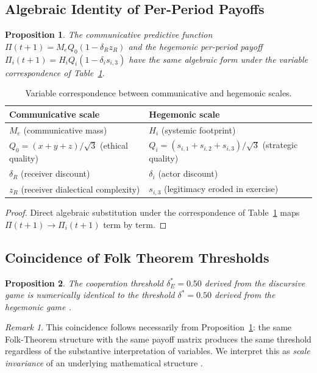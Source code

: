 \documentclass[12pt]{article}
\theoremstyle{plain}
\newtheorem{proposition}{Proposition}
\theoremstyle{definition}
\theoremstyle{remark}
\newtheorem{remark}{Remark}
\begin{document}
\subsection{Algebraic Identity of Per-Period Payoffs}

\begin{proposition}\label{prop:scale}
The communicative predictive function $\Pi(t+1) = M_e Q_0 (1 - \delta_R z_R)$ and the hegemonic per-period payoff $\Pi_i(t+1) = H_i Q_i (1 - \delta_i s_{i,3})$ have the same algebraic form under the variable correspondence of Table~\ref{tab:scale}.
\end{proposition}

\begin{table}[h]
\centering
\caption{Variable correspondence between communicative and hegemonic scales.}
\label{tab:scale}
{\small\begin{tabular}{ll}
\toprule
Communicative scale & Hegemonic scale \\
\midrule
$M_e$ (communicative mass) & $H_i$ (systemic footprint) \\
$Q_0 = (x+y+z)/\sqrt{3}$ (ethical quality) & $Q_i = (s_{i,1}+s_{i,2}+s_{i,3})/\sqrt{3}$ (strategic quality) \\
$\delta_R$ (receiver discount) & $\delta_i$ (actor discount) \\
$z_R$ (receiver dialectical complexity) & $s_{i,3}$ (legitimacy eroded in exercise) \\
\bottomrule
\end{tabular}}
\end{table}

\begin{proof}
Direct algebraic substitution under the correspondence of Table~\ref{tab:scale} maps $\Pi(t+1) \to \Pi_i(t+1)$ term by term.
\end{proof}

\subsection{Coincidence of Folk Theorem Thresholds}

\begin{proposition}\label{prop:threshold}
The cooperation threshold $\delta_E^* = 0.50$ derived from the discursive game \citep[App.~A]{marcelino2026a} is numerically identical to the threshold $\delta^* = 0.50$ derived from the hegemonic game \citep[Cap.~3]{marcelino2026b}.
\end{proposition}

\begin{remark}
This coincidence follows necessarily from Proposition~\ref{prop:scale}: the same Folk-Theorem structure with the same payoff matrix produces the same threshold regardless of the substantive interpretation of variables. We interpret this as \emph{scale invariance} of an underlying mathematical structure \citep{barabasi1999}.
\end{remark}
\end{document}
